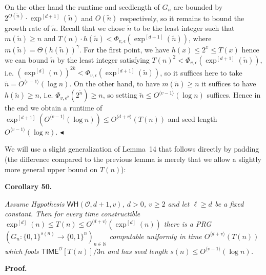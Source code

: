 \documentclass[10pt,a4paper]{article}
\begin{document}
On the other hand the runtime and seedlength of $G_{n}$ are bounded by $2^{O(\tilde{n})}\cdot\exp^{[d+1]}(\tilde{n})$ and $O(\tilde{n})$ respectively, so it remains to bound the growth rate of $\tilde{n}$. Recall that we chose $\tilde{n}$ to be the least integer such that $m(\tilde{n})\geq n$ and $T(n)\cdot h(\tilde{n})<\Phi_{v,\epsilon}(\exp^{[d+1]}(\tilde{n}))$, where $m(\tilde{n})=\Theta(h(\tilde{n}))^{\gamma}$. For the first point, we have $h(x)\leq 2^{x}\leq T(x)$ hence we can bound $\tilde{n}$ by the least integer satisfying $T(n)^{2}<\Phi_{v,\epsilon}(\exp^{[d+1]}(\tilde{n}))$, i.e. $(\exp^{[d]}(n))^{2k}<\Phi_{v,\epsilon}(\exp^{[d+1]}(\tilde{n}))$, so it suffices here to take $\tilde{n}=O^{\langle v-1\rangle}(\log n)$. On the other hand, to have $m(\tilde{n})\geq n$ it suffices to have $h(\tilde{n})\geq n$, i.e. $\Phi_{v,\epsilon^{2}}(2^{\tilde{n}})\geq n$, so setting $\tilde{n}\leq O^{\langle v-1\rangle}(\log n)$ suffices. Hence in the end we obtain a runtime of $\exp^{[d+1]}(O^{\langle v-1\rangle}(\log n))\leq O^{\langle d+v\rangle}(T(n))$ and seed length $O^{\langle v-1\rangle}(\log n)$.
$\blacktriangleleft$\par




We will use a slight generalization of Lemma 14 that follows directly by padding (the difference compared to the previous lemma is merely that we allow a slightly more general upper bound on $T(n)$):\par





\par\medskip\noindent\textbf{
\textbf{Corollary 50}\textbf{.}
}\par



\emph{Assume Hypothesis $\mathsf{WH}(\mathcal{O},d+1,v)$, $d>0$, $v\geq 2$ and let $\ell\geq d$ be a fixed constant. Then for every time constructible $\exp^{[d]}(n)\leq T(n)\leq O^{\langle d+v\rangle}(\exp^{[d]}(n))$ there is a PRG $(G_{n}:\{0,1\}^{s(n)}\to\{0,1\}^{n})_{n\in\mathbb{N}}$ computable uniformly in time $O^{\langle d+v\rangle}(T(n))$ which fools ${\mathsf{TIME}}^{\mathcal{O}}[T(n)]/3n$ and has seed length $s(n)\leq O^{\langle v-1\rangle}(\log n)$.}\par







\par\medskip\noindent\textbf{Proof.}\par
\end{document}
